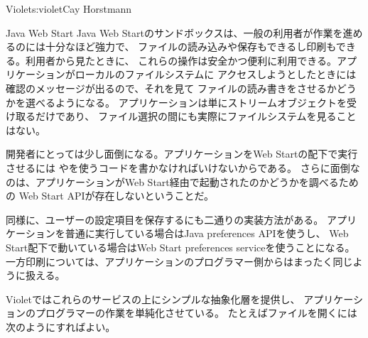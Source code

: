 \begin{aosachapter}{Violet}{s:violet}{Cay Horstmann}
\begin{aosasect1}{Java Web Start}
Java Web Startのサンドボックスは、一般の利用者が作業を進めるのには十分なほど強力で、
ファイルの読み込みや保存もできるし印刷もできる。利用者から見たときに、
これらの操作は安全かつ便利に利用できる。アプリケーションがローカルのファイルシステムに
アクセスしようとしたときには確認のメッセージが出るので、それを見て
ファイルの読み書きをさせるかどうかを選べるようになる。
アプリケーションは単にストリームオブジェクトを受け取るだけであり、
ファイル選択の間にも実際にファイルシステムを見ることはない。

開発者にとっては少し面倒になる。アプリケーションをWeb Startの配下で実行させるには
やを使うコードを書かなければいけないからである。
さらに面倒なのは、アプリケーションがWeb Start経由で起動されたのかどうかを調べるための
Web Start APIが存在しないということだ。

同様に、ユーザーの設定項目を保存するにも二通りの実装方法がある。
アプリケーションを普通に実行している場合はJava preferences APIを使うし、
Web Start配下で動いている場合はWeb Start preferences serviceを使うことになる。
一方印刷については、アプリケーションのプログラマー側からはまったく同じように扱える。

Violetではこれらのサービスの上にシンプルな抽象化層を提供し、
アプリケーションのプログラマーの作業を単純化させている。
たとえばファイルを開くには次のようにすればよい。


\end{aosasect1}
\end{aosachapter}
